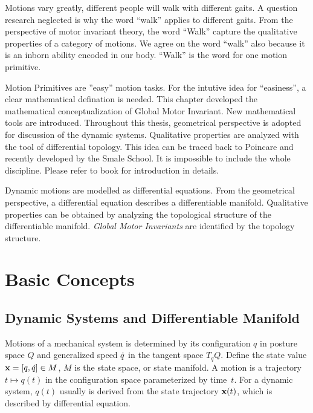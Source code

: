 \graphicspath{{GlobalInvariant/GlobalInvariantFigs/EPS/}{GlobalInvariant/GlobalInvariantFigs/}}


Motions vary greatly, different people will walk with different gaits. 
A question \cms research neglected is why the word ``walk'' applies to different gaits.
From the perspective of motor invariant theory, the word ``Walk'' capture the qualitative properties of a category of motions.
We agree on the word ``walk'' also because it is an inborn ability encoded in our body.
``Walk'' is the word for one motion primitive.


Motion Primitives are ''easy'' motion tasks. 
For the intutive idea for  ``easiness'', a clear mathematical defination is needed.
This chapter developed the mathematical conceptualization of Global Motor Invariant.
New mathematical tools are introduced.
Throughout this thesis,  geometrical perspective is adopted for discussion of the dynamic systems.
Qualitative properties are analyzed with the tool of differential topology.
This idea can be traced back to Poincare\citep{Poincar'e1899,Poincar'e1885} and recently developed by the Smale School\citep{Smale1970}.
It is impossible to include the whole discipline.
Please refer to book \citep{abraham1978foundations}for introduction in details.


Dynamic motions are modelled as differential equations.
From the geometrical perspective, a differential equation describes a differentiable manifold.
Qualitative properties can be obtained by analyzing the topological structure of the differentiable manifold.
\emph{Global Motor Invariants} are identified by the topology structure.


\section{Basic Concepts}



\subsection{Dynamic Systems and Differentiable Manifold}
Motions of a mechanical system is determined by its configuration  $q$ in posture space $Q$ and generalized speed $\dot{q}$ in the tangent space $T_{q}Q$. 
Define the state value $\mathbf{x}=[q,\dot{q}] \in M$,  $M$ is the state space, or state manifold.
A motion is a trajectory $t \mapsto q(t)$ in the configuration space parameterized by time~$t$.
For a dynamic system, $q(t)$ usually is derived from the state trajectory $\mathbf{x}(t)$, which is described by differential equation. 



